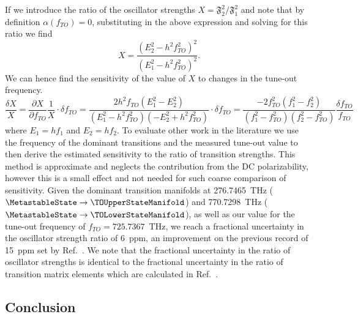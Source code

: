 	If we introduce  the ratio of the oscillator strengths $X=\mathfrak{F}_2^2/\mathfrak{F}_1^2$ and note that by definition \(\alpha(f_{TO})=0\), substituting in the above expression and solving for this ratio we find
	\begin{equation}
	    X =\frac{ (E_2^2 -h^2 f_{TO}^2 )^2}{(E_1^2-h^2 f_{TO}^2)^2}.
	\end{equation}
	We can hence find the sensitivity of the value of \(X\) to changes in the tune-out frequency.
	\begin{equation}
	    \frac{\delta X}{X} = \frac{\partial X} {\partial f_{TO}} \frac{1}{X} \cdot \delta f_{TO} =
	    \frac{2  h^2 f_{TO} (E_1^2-E_2^2)}
	    {(E_1^2-h^2 f_{TO}^2) (-E_2^2 + h^2 f_{TO}^2 )} \cdot \delta  f_{TO} = \frac{-2 f_{TO}^2 (f_1^2-f_2^2)}{(f_1^2-f_{TO}^2)(f_2^2-f_{TO}^2)} \frac{\delta  f_{TO}}{f_{TO}}
	\end{equation}
	where \(E_1=h f_1\) and \(E_2=h f_2\).
	To evaluate other work in the literature we use the frequency of the dominant transitions and the measured tune-out value to then derive the estimated sensitivity to the ratio of transition strengths. This method is approximate and neglects the contribution from the DC polarizability, however this is a small effect and not needed for such coarse comparison of sensitivity. Given the dominant transition manifolds at 276.7465~THz (\(\MetastableState \to \TOUpperStateManifold \)) and 770.7298~THz (\(\MetastableState \to \TOLowerStateManifold\)), as well as our value for the tune-out frequency of \(f_{TO}=725.7367\)~THz, we reach a fractional uncertainty in the oscillator strength ratio of 6~ppm, an improvement on the previous record of 15~ppm set by Ref.~\cite{Leonard15}. We note that the fractional uncertainty in the ratio of oscillator strengths is identical to the fractional uncertainty in the ratio of transition matrix elements which are calculated in Ref.~\cite{Leonard15}.

\subsection{Conclusion}

